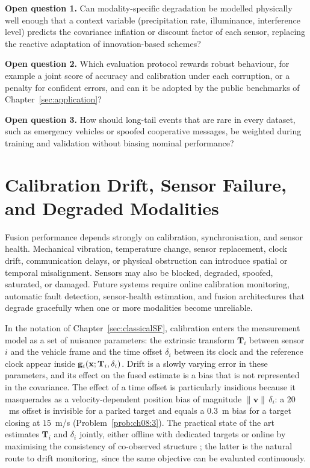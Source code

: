 \begin{list4a}
    \item \textbf{Open question 1.} Can modality-specific degradation be modelled physically well enough that a context variable (precipitation rate, illuminance, interference level) predicts the covariance inflation or discount factor of each sensor, replacing the reactive adaptation of innovation-based schemes?
    \item \textbf{Open question 2.} Which evaluation protocol rewards robust behaviour, for example a joint score of accuracy and calibration under each corruption, or a penalty for confident errors, and can it be adopted by the public benchmarks of Chapter~\ref{sec:application}?
    \item \textbf{Open question 3.} How should long-tail events that are rare in every dataset, such as emergency vehicles or spoofed cooperative messages, be weighted during training and validation without biasing nominal performance?
\end{list4a}

\section{Calibration Drift, Sensor Failure, and Degraded Modalities}
\label{subsec:oc-calibration}

Fusion performance depends strongly on calibration, synchronisation, and sensor health. Mechanical vibration, temperature change, sensor replacement, clock drift, communication delays, or physical obstruction can introduce spatial or temporal misalignment. Sensors may also be blocked, degraded, spoofed, saturated, or damaged. Future systems require online calibration monitoring, automatic fault detection, sensor-health estimation, and fusion architectures that degrade gracefully when one or more modalities become unreliable.

In the notation of Chapter~\ref{sec:classicalSF}, calibration enters the measurement model as a set of nuisance parameters: the extrinsic transform $\mathbf{T}_i$ between sensor $i$ and the vehicle frame and the time offset $\delta_i$ between its clock and the reference clock appear inside $\deletedmath{h_i}\added{\mathbf{g}_i}(\mathbf{x};\mathbf{T}_i,\delta_i)$. Drift is a slowly varying error in these parameters, and its effect on the fused estimate is a bias that is not represented in the covariance. The effect of a time offset is particularly insidious because it masquerades as a velocity-dependent position bias of magnitude $\lVert\mathbf{v}\rVert\,\delta_i$: a $20$~ms offset is invisible for a parked target and equals a $0.3$~m bias for a target closing at $15$~m/s (Problem~\ref{prob:ch08:3}). The practical state of the art estimates $\mathbf{T}_i$ and $\delta_i$ jointly, either offline with dedicated targets \cite{furgale2013_kalibr} or online by maximising the consistency of co-observed structure \cite{levinson2013_online_calibration}; the latter is the natural route to drift monitoring, since the same objective can be evaluated continuously.

